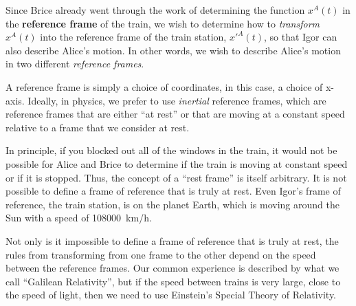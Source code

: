 Since Brice already went through the work of determining the function $x^A(t)$ in the \textbf{reference frame} of the train, we wish to determine how to \textit{transform} $x^A(t)$ into the reference frame of the train station, $x'^A(t)$, so that Igor can also describe Alice's motion. In other words, we wish to describe Alice's motion in two different \textit{reference frames}.


A reference frame is simply a choice of coordinates, in this case, a choice of x-axis. Ideally, in physics, we prefer to use \textit{inertial} reference frames, which are reference frames that are either ``at rest'' or that are moving at a constant speed relative to a frame that we consider at rest.
 
 
In principle, if you blocked out all of the windows in the train, it would not be possible for Alice and Brice to determine if the train is moving at constant speed or if it is stopped. Thus, the concept of a ``rest frame'' is itself arbitrary. It is not possible to define a frame of reference that is truly at rest. Even Igor's frame of reference, the train station, is on the planet Earth, which is moving around the Sun with a speed of \SI{108000}{km/h}.


Not only is it impossible to define a frame of reference that is truly at rest, the rules from transforming from one frame to the other depend on the speed between the reference frames. Our common experience is described by what we call ``Galilean Relativity'', but if the speed between trains is very large, close to the speed of light, then we need to use Einstein's Special Theory of Relativity.

